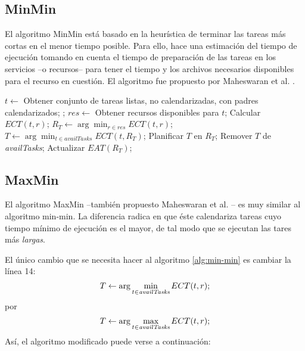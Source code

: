 \subsection{MinMin}
El algoritmo MinMin está basado en la heurística de terminar las tareas más cortas en el menor tiempo posible. Para ello, hace una estimación del tiempo de ejecución tomando en cuenta el tiempo de preparación de las tareas en los servicios --o recursos-- para tener el tiempo y los archivos necesarios disponibles para el recurso en cuestión. El algoritmo fue propuesto por Maheswaran et al. \cite{maheswaran1999dynamic}. 

\label{alg:min-min}
\begin{algorithmic}[1]
	\State $t \gets$ Obtener conjunto de tareas listas, no calendarizadas, con padres  calendarizados;
	\State {};
\EndWhile
{}
			\State $res \gets$ Obtener recursos disponibles para $t$;
				\State Calcular $ECT(t,r)$;
			\EndFor
			\State $R_T \gets \arg\min_{r \in res}ECT(t,r)$;
		\EndFor
		\State $T \gets \arg\min_{t \in availTasks}ECT(t,R_T)$;
		\State Planificar $T$ en $R_T$;
		\State Remover $T$ de \emph{availTasks};
		\State Actualizar $EAT(R_T)$;
	\EndWhile
\EndProcedure
\end{algorithmic}

\subsection{MaxMin}
El algoritmo MaxMin --también propuesto Maheswaran et al. \cite{maheswaran1999dynamic}-- es muy similar al algoritmo min-min. La diferencia radica en que éste calendariza tareas cuyo tiempo mínimo de ejecución es el mayor, de tal modo que se ejecutan las tares más \emph{largas}.

El único cambio que se necesita hacer al algoritmo \ref{alg:min-min} es cambiar la línea 14:
\[T \leftarrow \arg\min_{t \in \emph{availTasks}}ECT(t,r);\]
por
\[T \leftarrow \arg\max_{t \in \emph{availTasks}}ECT(t,r);\]
Así, el algoritmo modificado puede verse a continuación: %

